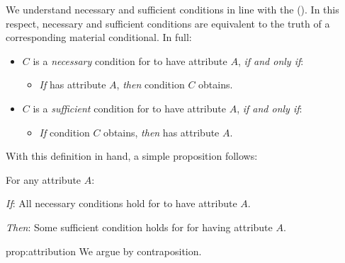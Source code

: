 \begin{note}
  We understand necessary and sufficient conditions in line with the   (\cite[cf.][\S2]{Brennan:2022aa}).
  In this respect, necessary and sufficient conditions are equivalent to the truth of a corresponding material conditional.
  In full:

  \begin{definition}
    \label{def:NScon}
    \vspace{-\baselineskip}
    \begin{itemize}
    \item
      \(C\) is a \emph{necessary} condition for \vAgent{} to have attribute \(A\), \emph{if and only if}:
      \begin{itemize}
      \item
        \emph{If} \vAgent{} has attribute \(A\), \emph{then} condition \(C\) obtains.
      \end{itemize}
    \item
      \(C\) is a \emph{sufficient} condition for \vAgent{} to have attribute \(A\), \emph{if and only if}:
      \begin{itemize}
      \item
        \emph{If} condition \(C\) obtains, \emph{then} \vAgent{} has attribute \(A\).
      \end{itemize}
    \end{itemize}
    \vspace{-\baselineskip}
  \end{definition}

  \noindent%
  With this definition in hand, a simple proposition follows:

  \begin{proposition}[Attribution]%
    \label{prop:attribution}%
    For any attribute \(A\):
    \begin{itenum}
    \item[\emph{If}:]
      All necessary conditions hold for \vAgent{} to have attribute \(A\).
    \item[\emph{Then}:]
      Some sufficient condition holds for \vAgent{} for having attribute \(A\).
    \end{itenum}
    \vspace{-\baselineskip}
  \end{proposition}

  \begin{argument}{prop:attribution}
    We argue by contraposition.


\end{argument}
\end{note}
